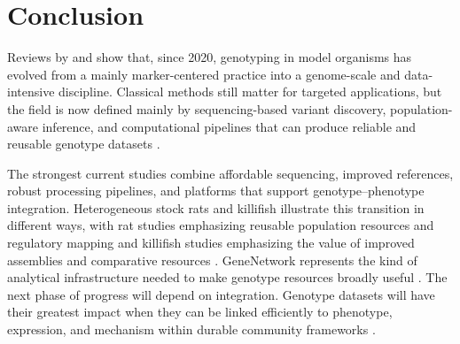\documentclass{article}
\begin{document}
\section{Conclusion}
Reviews by \textcite{kockum2023overview} and \textcite{satam2023next} show that, since 2020, genotyping in model organisms has evolved from a mainly marker-centered practice into a genome-scale and data-intensive discipline. Classical methods still matter for targeted applications, but the field is now defined mainly by sequencing-based variant discovery, population-aware inference, and computational pipelines that can produce reliable and reusable genotype datasets \parencite{lou2021beginner,zverinova2022variant}.

The strongest current studies combine affordable sequencing, improved references, robust processing pipelines, and platforms that support genotype--phenotype integration. Heterogeneous stock rats and killifish illustrate this transition in different ways, with rat studies emphasizing reusable population resources and regulatory mapping \parencite{de2024revamped,munro2022regulatory,tonnele2025genetic,kuhn2025genome} and killifish studies emphasizing the value of improved assemblies and comparative resources \parencite{johnson2025genome}. GeneNetwork represents the kind of analytical infrastructure needed to make genotype resources broadly useful \parencite{sloan2016genenetwork,mulligan2017genenetwork}. The next phase of progress will depend on integration. Genotype datasets will have their greatest impact when they can be linked efficiently to phenotype, expression, and mechanism within durable community frameworks \parencite{zinski2021genome}.

\printbibliography
\end{document}

